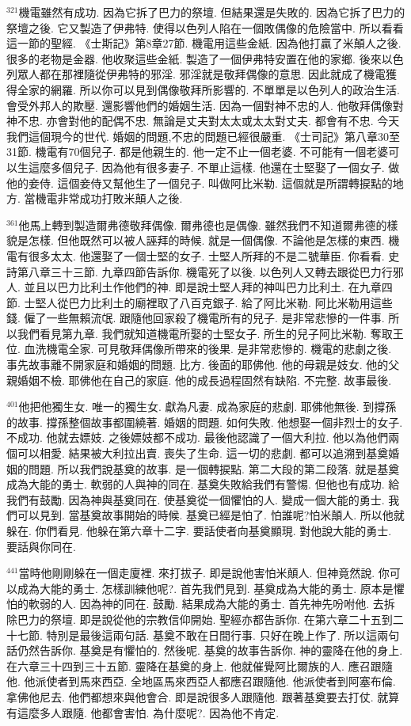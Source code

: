\documentclass{book}
\begin{document}
$^{321}$機電雖然有成功.
因為它拆了巴力的祭壇.
但結果還是失敗的.
因為它拆了巴力的祭壇之後.
它又製造了伊弗特.
使得以色列人陷在一個敗偶像的危險當中.
所以看看這一節的聖經.
《士斯記》第8章27節.
機電用這些金紙.
因為他打贏了米顛人之後.
很多的老物是金器.
他收聚這些金紙.
製造了一個伊弗特安置在他的家鄉.
後來以色列眾人都在那裡隨從伊弗特的邪淫.
邪淫就是敬拜偶像的意思.
因此就成了機電獲得全家的網羅.
所以你可以見到偶像敬拜所影響的.
不單單是以色列人的政治生活.
會受外邦人的欺壓.
還影響他們的婚姻生活.
因為一個對神不忠的人.
他敬拜偶像對神不忠.
亦會對他的配偶不忠.
無論是丈夫對太太或太太對丈夫.
都會有不忠.
今天我們這個現今的世代.
婚姻的問題,不忠的問題已經很嚴重.
《士司記》第八章30至31節.
機電有70個兒子.
都是他親生的.
他一定不止一個老婆.
不可能有一個老婆可以生這麼多個兒子.
因為他有很多妻子.
不單止這樣.
他還在士堅娶了一個女子.
做他的妾侍.
這個妾侍又幫他生了一個兒子.
叫做阿比米勒.
這個就是所謂轉捩點的地方.
當機電非常成功打敗米顛人之後.

$^{361}$他馬上轉到製造爾弗德敬拜偶像.
爾弗德也是偶像.
雖然我們不知道爾弗德的樣貌是怎樣.
但他既然可以被人誣拜的時候.
就是一個偶像.
不論他是怎樣的東西.
機電有很多太太.
他還娶了一個士堅的女子.
士堅人所拜的不是二號華臣.
你看看.
史詩第八章三十三節.
九章四節告訴你.
機電死了以後.
以色列人又轉去跟從巴力行邪人.
並且以巴力比利土作他們的神.
即是說士堅人拜的神叫巴力比利土.
在九章四節.
士堅人從巴力比利土的廟裡取了八百克銀子.
給了阿比米勒.
阿比米勒用這些錢.
僱了一些無賴流氓.
跟隨他回家殺了機電所有的兒子.
是非常悲慘的一件事.
所以我們看見第九章.
我們就知道機電所娶的士堅女子.
所生的兒子阿比米勒.
奪取王位.
血洗機電全家.
可見敬拜偶像所帶來的後果.
是非常悲慘的.
機電的悲劇之後.
事先故事離不開家庭和婚姻的問題.
比方.
後面的耶佛他.
他的母親是妓女.
他的父親婚姻不檢.
耶佛他在自己的家庭.
他的成長過程固然有缺陷.
不完整.
故事最後.

$^{401}$他把他獨生女.
唯一的獨生女.
獻為凡妻.
成為家庭的悲劇.
耶佛他無後.
到撐孫的故事.
撐孫整個故事都圍繞著.
婚姻的問題.
如何失敗.
他想娶一個非烈士的女子.
不成功.
他就去嫖妓.
之後嫖妓都不成功.
最後他認識了一個大利拉.
他以為他們兩個可以相愛.
結果被大利拉出賣.
喪失了生命.
這一切的悲劇.
都可以追溯到基奠婚姻的問題.
所以我們說基奠的故事.
是一個轉捩點.
第二大段的第二段落.
就是基奠成為大能的勇士.
軟弱的人與神的同在.
基奠失敗給我們有警惕.
但他也有成功.
給我們有鼓勵.
因為神與基奠同在.
使基奠從一個懼怕的人.
變成一個大能的勇士.
我們可以見到.
當基奠故事開始的時候.
基奠已經是怕了.
怕誰呢?怕米顛人.
所以他就躲在.
你們看見.
他躲在第六章十二字.
要話使者向基奠顯現.
對他說大能的勇士.
要話與你同在.

$^{441}$當時他剛剛躲在一個走廈裡.
來打拔子.
即是說他害怕米顛人.
但神竟然說.
你可以成為大能的勇士.
怎樣訓練他呢?.
首先我們見到.
基奠成為大能的勇士.
原本是懼怕的軟弱的人.
因為神的同在.
鼓勵.
結果成為大能的勇士.
首先神先吩咐他.
去拆除巴力的祭壇.
即是說從他的宗教信仰開始.
聖經亦都告訴你.
在第六章二十五到二十七節.
特別是最後這兩句話.
基奠不敢在日間行事.
只好在晚上作了.
所以這兩句話仍然告訴你.
基奠是有懼怕的.
然後呢.
基奠的故事告訴你.
神的靈降在他的身上.
在六章三十四到三十五節.
靈降在基奠的身上.
他就催覺阿比爾族的人.
應召跟隨他.
他派使者到馬來西亞.
全地區馬來西亞人都應召跟隨他.
他派使者到阿塞布倫.
拿佛他尼去.
他們都想來與他會合.
即是說很多人跟隨他.
跟著基奠要去打仗.
就算有這麼多人跟隨.
他都會害怕.
為什麼呢?.
因為他不肯定.
\end{document}
